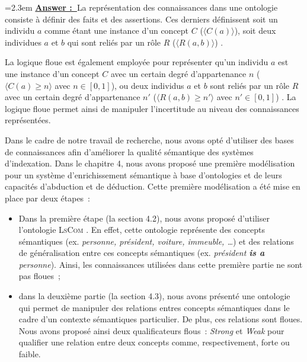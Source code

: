 \documentclass[11pt]{article}
\newcounter{commentNum}
\newcommand{\answer}[0]{\vspace{0.5em} \hangindent=2.3em \textbf{\textcolor{NavyBlue}{\uline{Answer \arabic{commentNum}:~}}}}
\begin{document}
\answer La représentation des connaissances dans une ontologie 
    consiste à définir des faits et des assertions. Ces derniers définissent  soit un individu 
    $a$ comme étant une instance d'un concept $C$ ($\langle{}C(a)\rangle{}$), soit deux 
    individues $a$ et $b$ qui sont reliés par un rôle $R$ ($\langle{}R(a,b)\rangle{}$) 
    \cite{Grau2008}. 
    
    La logique floue est également employée pour représenter qu'un individu $a$ est
    une instance d'un concept $C$ avec un certain degré d'appartenance 
    $n$ ($\langle{}C(a)\geq  n\rangle{}$ avec $n \in [0,1]$), ou deux individus 
    $a$ et $b$ sont reliés par un rôle $R$ avec un certain degré d'appartenance
    $n'$ ($\langle{} R(a,b)\geq  n'\rangle{}$ avec $n' \in [0,1]$) 
    \cite{Stoilos2007,Stoilos2010,Horrocks2011}. La logique floue permet ainsi de 
    manipuler l'incertitude au niveau des connaissances représentées. 
    
    
    Dans le cadre de notre travail de recherche, nous avons opté d'utiliser des bases de 
    connaissances afin d’améliorer la qualité sémantique des systèmes d’indexation. 
    Dans le chapitre 4, nous avons proposé une première modélisation pour un système d’enrichissement 
    sémantique à base d’ontologies et de leurs capacités d’abduction et de déduction. 
    Cette première modélisation a été mise en place par deux étapes :
      \begin{itemize}
       \item Dans la première étape (la section 4.2), nous avons proposé d’utiliser 
       l’ontologie \textsc{LsCom} \cite{Kennedy2006}. 
       En effet, cette ontologie représente des concepts sémantiques 
       (ex. \textit{personne, président, voiture, immeuble, \dots{}}) 
       et des relations de généralisation entre ces concepts sémantiques 
       (ex. \textit{président \textbf{is a} personne}). 
       Ainsi, les connaissances utilisées dans cette première partie ne sont pas floues ;
       
       \item dans la deuxième partie (la section 4.3), nous avons présenté une ontologie qui permet 
       de manipuler des relations entres concepts sémantiques dans le cadre d’un contexte
       sémantiques particulier. De plus, ces relations sont floues. Nous avons proposé ainsi 
       deux qualificateurs flous : \textit{Strong} et \textit{Weak} pour qualifier une 
       relation entre deux concepts comme, respectivement, forte ou faible. 
      \end{itemize}
      
\end{document}
